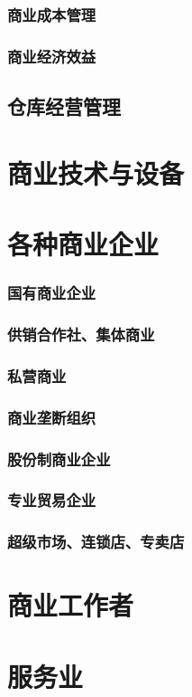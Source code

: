 \documentclass[UTF8]{../../RepresentationUniverse}
\begin{document}
        \subsubsection{商业成本管理}
        \subsubsection{商业经济效益}
    \subsection{仓库经营管理}
\section{商业技术与设备}
\section{各种商业企业}
    \subsubsection{国有商业企业}
    \subsubsection{供销合作社、集体商业}
    \subsubsection{私营商业}
    \subsubsection{商业垄断组织}
    \subsubsection{股份制商业企业}
    \subsubsection{专业贸易企业}
    \subsubsection{超级市场、连锁店、专卖店}
\section{商业工作者}
\section{服务业}
\end{document}
